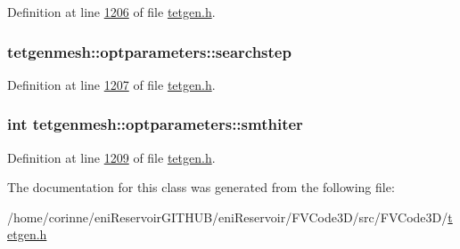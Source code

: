 Definition at line \hyperlink{tetgen_8h_source_l01206}{1206} of file \hyperlink{tetgen_8h_source}{tetgen.\+h}.

\subsubsection[{\texorpdfstring{searchstep}{searchstep}}]{ tetgenmesh\+::optparameters\+::searchstep}\hypertarget{classtetgenmesh_1_1optparameters_ace9dd689b3cb7b135573b46fbf6afed2}{}\label{classtetgenmesh_1_1optparameters_ace9dd689b3cb7b135573b46fbf6afed2}


Definition at line \hyperlink{tetgen_8h_source_l01207}{1207} of file \hyperlink{tetgen_8h_source}{tetgen.\+h}.

\subsubsection[{\texorpdfstring{smthiter}{smthiter}}]{\setlength{\rightskip}{0pt plus 5cm}int tetgenmesh\+::optparameters\+::smthiter}\hypertarget{classtetgenmesh_1_1optparameters_a7c01e6bed6c1f6188f7408f84b9644d9}{}\label{classtetgenmesh_1_1optparameters_a7c01e6bed6c1f6188f7408f84b9644d9}


Definition at line \hyperlink{tetgen_8h_source_l01209}{1209} of file \hyperlink{tetgen_8h_source}{tetgen.\+h}.



The documentation for this class was generated from the following file\+:\begin{DoxyCompactItemize}
\item 
/home/corinne/eni\+Reservoir\+G\+I\+T\+H\+U\+B/eni\+Reservoir/\+F\+V\+Code3\+D/src/\+F\+V\+Code3\+D/\hyperlink{tetgen_8h}{tetgen.\+h}\end{DoxyCompactItemize}
